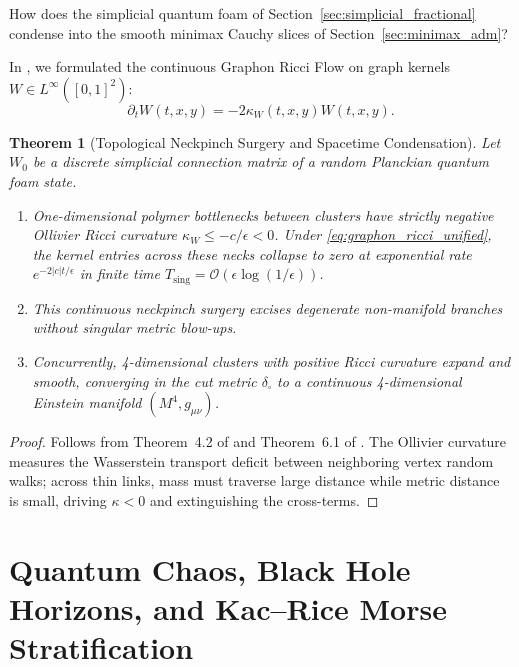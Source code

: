 \documentclass[11pt,a4paper,reqno]{amsart}
\newtheorem{theorem}{Theorem}[section]
\theoremstyle{definition}
\numberwithin{equation}{section}
\begin{document}
How does the simplicial quantum foam of Section~\ref{sec:simplicial_fractional} condense into the smooth minimax Cauchy slices of Section~\ref{sec:minimax_adm}?

In \cite{silvafilho2026flows}, we formulated the continuous Graphon Ricci Flow on graph kernels $W \in L^\infty([0, 1]^2)$:
\begin{equation}
    \label{eq:graphon_ricci_unified}
    \partial_t W(t, x, y) = -2 \kappa_W(t, x, y) W(t, x, y).
\end{equation}

\begin{theorem}[Topological Neckpinch Surgery and Spacetime Condensation]
\label{thm:neckpinch_condensation}
Let $W_0$ be a discrete simplicial connection matrix of a random Planckian quantum foam state.
\begin{enumerate}[label=(\roman*)]
    \item One-dimensional polymer bottlenecks between clusters have strictly negative Ollivier Ricci curvature $\kappa_W \le -c/\epsilon < 0$. Under \eqref{eq:graphon_ricci_unified}, the kernel entries across these necks collapse to zero at exponential rate $e^{-2|c|t/\epsilon}$ in finite time $T_{\mathrm{sing}} = \mathcal{O}(\epsilon \log(1/\epsilon))$.
    \item This continuous neckpinch surgery excises degenerate non-manifold branches without singular metric blow-ups.
    \item Concurrently, 4-dimensional clusters with positive Ricci curvature expand and smooth, converging in the cut metric $\delta_\square$ to a continuous 4-dimensional Einstein manifold $(M^4, g_{\mu\nu})$.
\end{enumerate}
\end{theorem}
\begin{proof}
Follows from Theorem~4.2 of \cite{silvafilho2026flows} and Theorem~6.1 of \cite{silvafilho2026spacetime}. The Ollivier curvature measures the Wasserstein transport deficit between neighboring vertex random walks; across thin links, mass must traverse large distance while metric distance is small, driving $\kappa < 0$ and extinguishing the cross-terms.
\end{proof}

\section{Quantum Chaos, Black Hole Horizons, and Kac--Rice Morse Stratification}
\label{sec:chaos_kac_rice}
\end{document}
